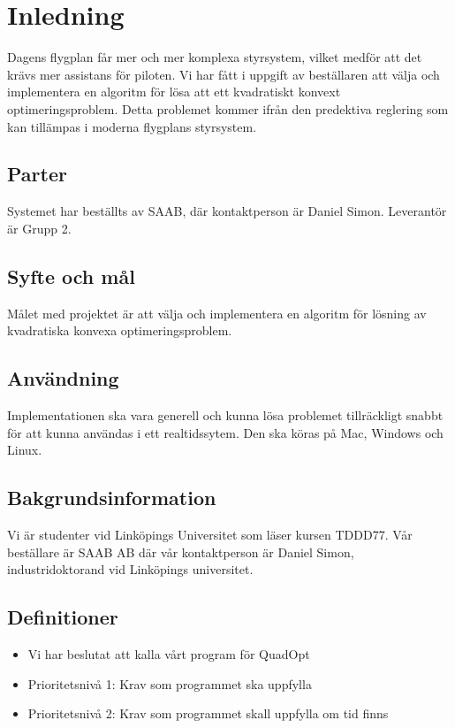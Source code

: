 \section{Inledning}
Dagens flygplan får mer och mer komplexa styrsystem, vilket medför att det krävs mer assistans för piloten. Vi har fått i uppgift av beställaren att välja och implementera en algoritm för lösa att ett kvadratiskt konvext optimeringsproblem. Detta problemet kommer ifrån den predektiva reglering som kan tillämpas i moderna flygplans styrsystem.

\subsection{Parter}
Systemet har beställts av SAAB, där kontaktperson är Daniel Simon. Leverantör är Grupp 2.

\subsection{Syfte och mål}
Målet med projektet är att välja och implementera en algoritm för lösning av kvadratiska konvexa optimeringsproblem.

\subsection{Användning}
Implementationen ska vara generell och kunna lösa problemet tillräckligt snabbt för att kunna användas i ett realtidssytem. Den ska köras på Mac, Windows och Linux.
\subsection{Bakgrundsinformation}
Vi är studenter vid Linköpings Universitet som läser kursen TDDD77. Vår beställare är SAAB AB där vår kontaktperson är Daniel Simon, industridoktorand vid Linköpings universitet. 

\subsection{Definitioner}

\begin{itemize}
\item{Vi har beslutat att kalla vårt program för QuadOpt}
\item{Prioritetsnivå 1: Krav som programmet ska uppfylla}
\item{Prioritetsnivå 2: Krav som programmet skall uppfylla om tid finns}
\end{itemize}
